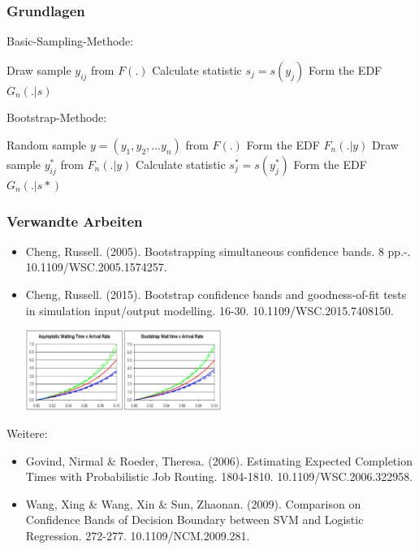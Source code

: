 \documentclass[aspectratio=1610, 9pt]{beamer}
\begin{document}
\begin{frame}
  \frametitle{Grundlagen}
  \hspace{20px} \vline \hspace{5px}   
  \begin{minipage}[t]{0.3\linewidth}
    Basic-Sampling-Methode: \\
    \begin{algorithmic}
				  \State Draw sample $y_{ij}$ from $F(.)$
				\EndFor
				\State Calculate statistic $s_j = s(y_j)$
			\EndFor
			\State Form the EDF $G_n(.|s)$
	  \end{algorithmic}
  \end{minipage}
  \hspace{10px} \vline \hspace{5px}
  \begin{minipage}[t]{0.48\linewidth}    
    Bootstrap-Methode: \\
    \begin{algorithmic}
      \Require Random sample $y = (y_1, y_2, ...y_n)$ from $F(.)$
      \State Form the EDF $F_n(.|y)$
				  \State Draw sample $y^*_{ij}$ from $F_n(.|y)$
				\EndFor
				\State Calculate statistic $s^*_j = s(y^*_j)$
			\EndFor
			\State Form the EDF $G_n(.|s*)$
	  \end{algorithmic}
  \end{minipage}
\end{frame}

\begin{frame}
  \frametitle{Verwandte Arbeiten} 
  \begin{itemize}
    \item Cheng, Russell. (2005). Bootstrapping simultaneous confidence bands. 8 pp.-. 10.1109/WSC.2005.1574257.
    \item Cheng, Russell. (2015). Bootstrap confidence bands and goodness-of-fit tests in simulation input/output modelling. 16-30. 10.1109/WSC.2015.7408150.
    \begin{center}
      \includegraphics[width=0.5\textwidth]{images/3.png}
    \end{center}
  \end{itemize}
  Weitere:
  \begin{itemize}
    \item Govind, Nirmal \& Roeder, Theresa. (2006). Estimating Expected Completion Times with Probabilistic Job Routing. 1804-1810. 10.1109/WSC.2006.322958. 
    \item Wang, Xing \& Wang, Xin \& Sun, Zhaonan. (2009). Comparison on Confidence Bands of Decision Boundary between SVM and Logistic Regression. 272-277. 10.1109/NCM.2009.281.
  \end{itemize}
\end{frame}
\end{document}
